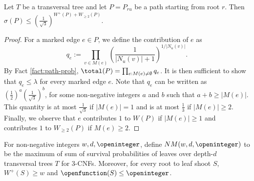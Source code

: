 \begin{lemma}
\label{lemma:double-marking-weight}
Let $T$ be a transversal tree and let $P = P_{ru}$ be a path starting from root $r$. Then $\sigma(P) \le (\frac{1}{\sqrt{3}})^{W^{+}(P) + W_{\ge 2}(P)}$.
\end{lemma}

\begin{proof}
For a marked edge $e \in P$, we define the contribution of $e$ as
\[
q_e := \prod_{v \in M(e)}\left(\frac{1}{|N_u(v)|+1}\right)^{1/|N_u(v)|}.
\]
By Fact \ref{fact:path-prob}, $\total(P) = \prod_{e : M(e) \ne \emptyset} q_e$. It is then sufficient to show that $q_e \le \lambda$ for every marked edge $e$. Note that $q_e$ can be written as $(\frac{1}{2})^a (\frac{1}{\sqrt{3}})^b$, for some non-negative integers $a$ and $b$ such that $a + b \ge |M(e)|$. This quantity is at most $\frac{1}{\sqrt{3}}$ if $|M(e)| = 1$ and is at most $\frac{1}{3}$ if $|M(e)| \ge 2$. Finally, we observe that $e$ contributes $1$ to $W(P)$ if $|M(e)| \ge 1$ and contributes $1$ to $W_{\ge 2}(P)$ if $M(e) \ge 2$.
\end{proof}



\begin{definition}[$NM(w, d, \openinteger)$]
For non-negative integers $w, d, \openinteger$, define $NM(w, d, \openinteger)$ to be the maximum of sum of survival probabilities of leaves over depth-$d$ transversal trees $T$ for $3$-CNFs. Moreover, for every root to leaf shoot $S$, $W^+(S) \ge w$ and $\openfunction(S) \le \openinteger$.
\end{definition}






